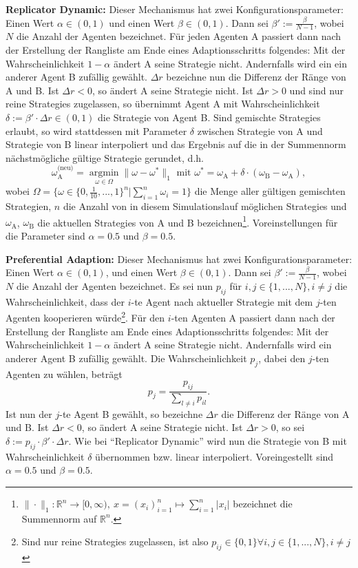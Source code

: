 \documentclass[parskip=full,11pt]{scrartcl}
\def\adapt{Adaptionsschritt}
\begin{document}
\textbf{Replicator Dynamic:}
Dieser Mechanismus hat zwei Konfigurationsparameter: Einen Wert \(\alpha \in (0,1)\) und einen Wert \(\beta \in (0,1)\). Dann sei \(\beta' := \frac{\beta}{N-1}\), wobei \(N\) die Anzahl der Agenten bezeichnet. Für jeden Agenten A passiert dann nach der Erstellung der Rangliste am Ende eines \adapt s folgendes: Mit der Wahrscheinlichkeit \(1 - \alpha\) ändert A seine \Gls{Strategie} nicht. Andernfalls wird ein ein anderer Agent B zufällig gewählt. \(\Delta r\) bezeichne nun die Differenz der Ränge von A und B. Ist \(\Delta r < 0\), so ändert A seine \Gls{Strategie} nicht. Ist \(\Delta r > 0\) und sind nur reine \Glspl{Strategie} zugelassen, so übernimmt Agent A mit Wahrscheinlichkeit \(\delta := \beta' \cdot \Delta r \in (0,1)\) die \Gls{Strategie} von Agent B. Sind \glspl{gemischte Strategie} erlaubt, so wird stattdessen mit Parameter \(\delta\) zwischen \Gls{Strategie} von A und \Gls{Strategie} von B linear interpoliert und das Ergebnis auf die in der Summennorm nächstmögliche gültige \Gls{Strategie} gerundet, d.h.
\[
\omega_\text{A}^\text{(neu)} = \underset{\omega \in \Omega}{\operatorname{arg min}} \|\omega - \omega^*\|_1 \text{  mit  } \omega^* = \omega_\text{A} + \delta \cdot (\omega_\text{B} - \omega_\text{A}),
\]
wobei \(\Omega = \{\omega \in \{0,\frac{1}{10},...,1\}^n | \sum_{i=1}^n \omega_i = 1\}\) die Menge aller gültigen gemischten Strategien, \(n\) die Anzahl von in diesem Simulationslauf möglichen \Glspl{Strategie} und \(\omega_\text{A}\), \(\omega_\text{B}\) die aktuellen \Glspl{Strategie} von A und B bezeichnen\footnote{\(\|\cdot\|_1 : \mathbb{R}^n \rightarrow [0,\infty), \ x = (x_i)_{i=1}^n \mapsto \sum_{i=1}^n |x_i|\) bezeichnet die Summennorm auf \(\mathbb{R}^n\).}. Voreinstellungen für die Parameter sind \(\alpha = 0.5\) und \(\beta = 0.5\).

\textbf{Preferential Adaption:}
Dieser Mechanismus hat zwei Konfigurationsparameter: Einen Wert \(\alpha \in (0,1)\), und einen Wert \(\beta \in (0,1)\). Dann sei \(\beta' := \frac{\beta}{N-1}\), wobei \(N\) die Anzahl der Agenten bezeichnet. Es sei nun \(p_{ij}\) für \(i,j \in \{1,...,N\}, i \neq j\) die Wahrscheinlichkeit, dass der \(i\)-te Agent nach aktueller \Gls{Strategie} mit dem \(j\)-ten Agenten kooperieren würde\footnote{Sind nur reine \Glspl{Strategie} zugelassen, ist also \(p_{ij} \in \{0,1\} \forall i,j \in \{1,...,N\}, i \neq j\)}. Für den \(i\)-ten Agenten A passiert dann nach der Erstellung der Rangliste am Ende eines \adapt s folgendes: Mit der Wahrscheinlichkeit \(1 - \alpha\) ändert A seine \Gls{Strategie} nicht. Andernfalls wird ein anderer Agent B zufällig gewählt. Die Wahrscheinlichkeit \(p_j\), dabei den \(j\)-ten Agenten zu wählen, beträgt
\[
p_j = \frac{p_{ij}}{\sum_{l \neq i} p_{il}}.
\]
Ist nun der \(j\)-te Agent B gewählt, so bezeichne \(\Delta r\) die Differenz der Ränge von A und B. Ist \(\Delta r < 0\), so ändert A seine \Gls{Strategie} nicht. Ist \(\Delta r > 0\), so sei \(\delta := p_{ij} \cdot \beta' \cdot \Delta r\). Wie bei \enquote{Replicator Dynamic} wird nun die \Gls{Strategie} von B mit Wahrscheinlichkeit \(\delta\) übernommen bzw. linear interpoliert. Voreingestellt sind \(\alpha = 0.5\) und \(\beta = 0.5\).
\end{document}
